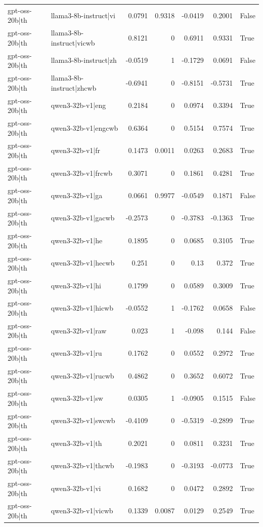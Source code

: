 \begin{table}
\begin{tabular}{l l r r r r l}
gpt-oss-20b|th & llama3-8b-instruct|vi & 0.0791 & 0.9318 & -0.0419 & 0.2001 & False \\
gpt-oss-20b|th & llama3-8b-instruct|vicwb & 0.8121 & 0 & 0.6911 & 0.9331 & True \\
gpt-oss-20b|th & llama3-8b-instruct|zh & -0.0519 & 1 & -0.1729 & 0.0691 & False \\
gpt-oss-20b|th & llama3-8b-instruct|zhcwb & -0.6941 & 0 & -0.8151 & -0.5731 & True \\
gpt-oss-20b|th & qwen3-32b-v1|eng & 0.2184 & 0 & 0.0974 & 0.3394 & True \\
gpt-oss-20b|th & qwen3-32b-v1|engcwb & 0.6364 & 0 & 0.5154 & 0.7574 & True \\
gpt-oss-20b|th & qwen3-32b-v1|fr & 0.1473 & 0.0011 & 0.0263 & 0.2683 & True \\
gpt-oss-20b|th & qwen3-32b-v1|frcwb & 0.3071 & 0 & 0.1861 & 0.4281 & True \\
gpt-oss-20b|th & qwen3-32b-v1|ga & 0.0661 & 0.9977 & -0.0549 & 0.1871 & False \\
gpt-oss-20b|th & qwen3-32b-v1|gacwb & -0.2573 & 0 & -0.3783 & -0.1363 & True \\
gpt-oss-20b|th & qwen3-32b-v1|he & 0.1895 & 0 & 0.0685 & 0.3105 & True \\
gpt-oss-20b|th & qwen3-32b-v1|hecwb & 0.251 & 0 & 0.13 & 0.372 & True \\
gpt-oss-20b|th & qwen3-32b-v1|hi & 0.1799 & 0 & 0.0589 & 0.3009 & True \\
gpt-oss-20b|th & qwen3-32b-v1|hicwb & -0.0552 & 1 & -0.1762 & 0.0658 & False \\
gpt-oss-20b|th & qwen3-32b-v1|raw & 0.023 & 1 & -0.098 & 0.144 & False \\
gpt-oss-20b|th & qwen3-32b-v1|ru & 0.1762 & 0 & 0.0552 & 0.2972 & True \\
gpt-oss-20b|th & qwen3-32b-v1|rucwb & 0.4862 & 0 & 0.3652 & 0.6072 & True \\
gpt-oss-20b|th & qwen3-32b-v1|sw & 0.0305 & 1 & -0.0905 & 0.1515 & False \\
gpt-oss-20b|th & qwen3-32b-v1|swcwb & -0.4109 & 0 & -0.5319 & -0.2899 & True \\
gpt-oss-20b|th & qwen3-32b-v1|th & 0.2021 & 0 & 0.0811 & 0.3231 & True \\
gpt-oss-20b|th & qwen3-32b-v1|thcwb & -0.1983 & 0 & -0.3193 & -0.0773 & True \\
gpt-oss-20b|th & qwen3-32b-v1|vi & 0.1682 & 0 & 0.0472 & 0.2892 & True \\
gpt-oss-20b|th & qwen3-32b-v1|vicwb & 0.1339 & 0.0087 & 0.0129 & 0.2549 & True \\

\end{tabular}
\end{table}
